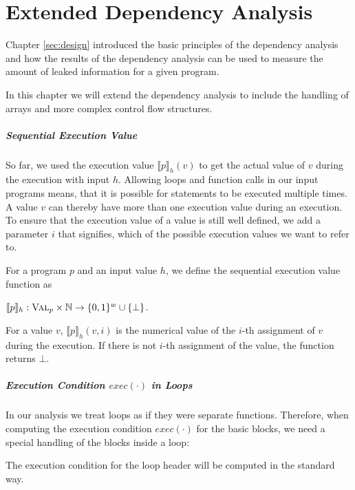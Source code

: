 \chapter{Extended Dependency Analysis}\label{ch:loops}

Chapter \ref{sec:design} introduced the basic principles of the dependency analysis and how the results of the dependency analysis can be used to measure the amount of leaked information for a given program.

In this chapter we will extend the dependency analysis to include the handling of arrays and more complex control flow structures.

\paragraph{Sequential Execution Value}
So far, we used the execution value $\llbracket p \rrbracket_h (v)$ to get the actual value of $v$ during the execution with input $h$. Allowing loops and function calls in our input programs means, that it is possible for statements to be executed multiple times. A value $v$ can thereby have more than one execution value during an execution.
To ensure that the execution value of a value is still well defined, we add a parameter $i$ that signifies, which of the possible execution values we want to refer to.

\begin{definition}
    For a program $p$ and an input value $h$, we define the sequential execution value function as
    \begin{center}
        $\llbracket p \rrbracket_h: \textsc{Val}_p \times \mathbb{N} \to \{0, 1\} ^w \cup \{\bot\}$.
    \end{center}
    For a value $v$, $\llbracket p \rrbracket_h(v, i)$ is the numerical value of the $i$-th assignment of $v$ during the execution. If there is not $i$-th assignment of the value, the function returns $\bot$.
\end{definition}

\paragraph{Execution Condition $exec(\cdot)$ in Loops}
In our analysis we treat loops as if they were separate functions. Therefore, when computing the execution condition $exec(\cdot)$ for the basic blocks, we need a special handling of the blocks inside a loop:

The execution condition for the loop header will be computed in the standard way.

